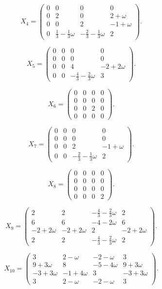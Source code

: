 \[ X_{4}=\begin{pmatrix}
0 & 0 & 0 & 0 \\
0 & 2 & 0 & 2+\omega \\
0 & 0 & 2 & -1+\omega \\
0 & \frac{1}{3}-\frac{1}{3}\omega & -\frac{2}{3}-\frac{1}{3}\omega & 2
\end{pmatrix}.\]

\[ X_{5}=\begin{pmatrix}
0 & 0 & 0 & 0 \\
0 & 0 & 0 & 0 \\
0 & 0 & 4 & -2+2\omega \\
0 & 0 & -\frac{4}{3}-\frac{2}{3}\omega & 3
\end{pmatrix}.\]

\[ X_{6}=\begin{pmatrix}
0 & 0 & 0 & 0 \\
0 & 0 & 0 & 0 \\
0 & 0 & 2 & 0 \\
0 & 0 & 0 & 0
\end{pmatrix}.\]

\[ X_{7}=\begin{pmatrix}
0 & 0 & 0 & 0 \\
0 & 0 & 0 & 0 \\
0 & 0 & 2 & -1+\omega \\
0 & 0 & -\frac{2}{3}-\frac{1}{3}\omega & 2
\end{pmatrix}.\]

\[ X_{8}=\begin{pmatrix}
0 & 0 & 0 & 0 \\
0 & 0 & 0 & 0 \\
0 & 0 & 0 & 0 \\
0 & 0 & 0 & 2
\end{pmatrix}.\]

\[ X_{9}=\begin{pmatrix}
2 & 2 & -\frac{4}{3}-\frac{2}{3}\omega & 2 \\
6 & 6 & -4-2\omega & 6 \\
-2+2\omega & -2+2\omega & 2 & -2+2\omega \\
2 & 2 & -\frac{4}{3}-\frac{2}{3}\omega & 2
\end{pmatrix}.\]

\[ X_{10}=\begin{pmatrix}
3 & 2-\omega & -2-\omega & 3 \\
9+3\omega & 8 & -5-4\omega & 9+3\omega \\
-3+3\omega & -1+4\omega & 3 & -3+3\omega \\
3 & 2-\omega & -2-\omega & 3
\end{pmatrix}.\]

